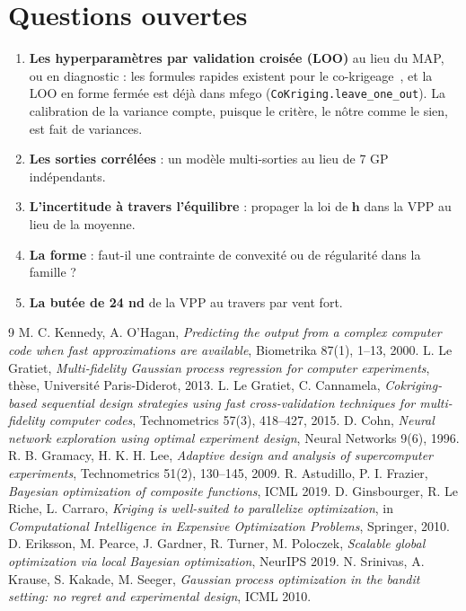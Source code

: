 \documentclass[11pt,a4paper]{article}
\newcommand{\vh}{\bm{h}}
\newcommand{\py}[1]{\texttt{#1}}
\begin{document}
\section{Questions ouvertes}
\begin{enumerate}
  \item \textbf{Les hyperparamètres par validation croisée (LOO)} au lieu du MAP, ou en diagnostic : les
        formules rapides existent pour le co-krigeage~\cite{LGC15}, et la LOO en forme fermée est déjà dans
        mfego (\py{CoKriging.leave\_one\_out}). La calibration de la variance compte, puisque le critère, le
        nôtre comme le sien, est fait de variances.
  \item \textbf{Les sorties corrélées} : un modèle multi-sorties au lieu de 7 GP indépendants.
  \item \textbf{L'incertitude à travers l'équilibre} : propager la loi de $\vh$ dans la VPP au lieu de la
        moyenne.
  \item \textbf{La forme} : faut-il une contrainte de convexité ou de régularité dans la famille ?
  \item \textbf{La butée de 24 nd} de la VPP au travers par vent fort.
\end{enumerate}

\begin{thebibliography}{9}\footnotesize\setlength{\itemsep}{0pt}
 M. C. Kennedy, A. O'Hagan, \emph{Predicting the output from a complex computer code when fast
approximations are available}, Biometrika 87(1), 1–13, 2000.
 L. Le Gratiet, \emph{Multi-fidelity Gaussian process regression for computer experiments},
thèse, Université Paris-Diderot, 2013.
 L. Le Gratiet, C. Cannamela, \emph{Cokriging-based sequential design strategies using fast
cross-validation techniques for multi-fidelity computer codes}, Technometrics 57(3), 418–427, 2015.
 D. Cohn, \emph{Neural network exploration using optimal experiment design}, Neural
Networks 9(6), 1996.
 R. B. Gramacy, H. K. H. Lee, \emph{Adaptive design and analysis of supercomputer experiments},
Technometrics 51(2), 130–145, 2009.
 R. Astudillo, P. I. Frazier, \emph{Bayesian optimization of composite functions}, ICML 2019.
 D. Ginsbourger, R. Le Riche, L. Carraro, \emph{Kriging is well-suited to parallelize
optimization}, in \emph{Computational Intelligence in Expensive Optimization Problems}, Springer, 2010.
 D. Eriksson, M. Pearce, J. Gardner, R. Turner, M. Poloczek, \emph{Scalable global
optimization via local Bayesian optimization}, NeurIPS 2019.
 N. Srinivas, A. Krause, S. Kakade, M. Seeger, \emph{Gaussian process optimization in
the bandit setting: no regret and experimental design}, ICML 2010.
\end{thebibliography}
\end{document}
